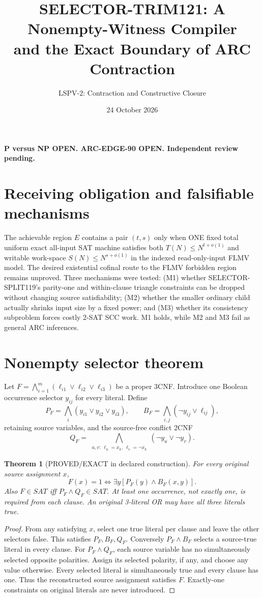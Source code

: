 \documentclass[11pt]{article}
\title{SELECTOR-TRIM121: A Nonempty-Witness Compiler\\and the Exact Boundary of ARC Contraction}
\author{LSPV-2: Contraction and Constructive Closure}
\date{24 October 2026}
\newtheorem{theorem}{Theorem}
\begin{document}
\maketitle
\begin{center}\textbf{P versus NP OPEN. ARC-EDGE-90 OPEN. Independent review pending.}\end{center}
\section{Receiving obligation and falsifiable mechanisms}
The achievable region $E$ contains a pair $(t,s)$ only when ONE fixed total uniform exact all-input SAT machine satisfies both $T(N)\le N^{t+o(1)}$ and writable work-space $S(N)\le N^{s+o(1)}$ in the indexed read-only-input FLMV model. The desired existential cofinal route to the FLMV forbidden region remains unproved.
Three mechanisms were tested: (M1) whether SELECTOR-SPLIT119's parity-one and within-clause triangle constraints can be dropped without changing source satisfiability; (M2) whether the smaller ordinary child actually shrinks input size by a fixed power; and (M3) whether its consistency subproblem forces costly 2-SAT SCC work. M1 holds, while M2 and M3 fail as general ARC inferences.
\section{Nonempty selector theorem}
Let $F=\bigwedge_{i=1}^m(\ell_{i1}\vee\ell_{i2}\vee\ell_{i3})$ be a proper 3CNF. Introduce one Boolean occurrence selector $y_{ij}$ for every literal. Define
\[
P_F=\bigwedge_i(y_{i1}\vee y_{i2}\vee y_{i3}),\qquad
B_F=\bigwedge_{i,j}(\neg y_{ij}\vee\ell_{ij}),
\]
retaining source variables, and the source-free conflict 2CNF
\[
Q_F=\bigwedge_{\substack{u,v:\ \ell_u=x_k,\ \ell_v=\neg x_k}}
(\neg y_u\vee\neg y_v).
\]
\begin{theorem}[PROVED/EXACT in declared construction]
For every original source assignment $x$,
\[
F(x)=1\iff \exists y[P_F(y)\land B_F(x,y)].
\]
Also $F\in SAT$ iff $P_F\land Q_F\in SAT$. At least one occurrence, not exactly one, is required from each clause. An original 3-literal OR may have all three literals true.
\end{theorem}
\begin{proof}
From any satisfying $x$, select one true literal per clause and leave the other selectors false. This satisfies $P_F,B_F,Q_F$. Conversely $P_F\land B_F$ selects a source-true literal in every clause. For $P_F\land Q_F$, each source variable has no simultaneously selected opposite polarities. Assign its selected polarity, if any, and choose any value otherwise. Every selected literal is simultaneously true and every clause has one. Thus the reconstructed source assignment satisfies $F$. Exactly-one constraints on original literals are never introduced.
\end{proof}
\end{document}
